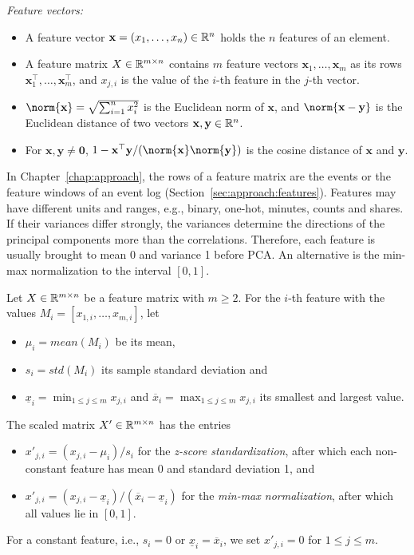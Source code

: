 \medskip
\noindent\emph{Feature vectors:}
\begin{itemize}[beginpenalty=10000]
	\item A feature vector $\mathbf{x} = (x_1, \dots, x_n) \in \mathbb R^n$ holds the $n$ features of an element.
	\item A feature matrix $X \in \mathbb R^{m \times n}$ contains $m$ feature vectors $\mathbf{x}_1, \dots, \mathbf{x}_m$ as its rows $\mathbf{x}_1^\top, \dots, \mathbf{x}_m^\top$, and $x_{j,i}$ is the value of the $i$-th feature in the $j$-th vector.
	\item $\norm{\mathbf{x}} = \sqrt{\sum_{i=1}^{n} x_i^2}$ is the Euclidean norm of $\mathbf{x}$, and $\norm{\mathbf{x} - \mathbf{y}}$ is the Euclidean distance of two vectors $\mathbf{x}, \mathbf{y} \in \mathbb R^n$.
	\item For $\mathbf{x}, \mathbf{y} \neq \mathbf{0}$, $1 - \mathbf{x}^\top \mathbf{y} / (\norm{\mathbf{x}} \norm{\mathbf{y}})$ is the cosine distance of $\mathbf{x}$ and $\mathbf{y}$.
\end{itemize}

In Chapter~\ref{chap:approach}, the rows of a feature matrix are the events or the feature windows of an event log (Section~\ref{sec:approach:features}). Features may have different units and ranges, e.g., binary, one-hot, minutes, counts and shares. If their variances differ strongly, the variances determine the directions of the principal components more than the correlations. Therefore, each feature is usually brought to mean 0 and variance 1 before PCA. An alternative is the min-max normalization to the interval $[0, 1]$.

\begin{definition}[Scaling]
	\label{def:prelim:scaling}
	Let $X \in \mathbb R^{m \times n}$ be a feature matrix with $m \ge 2$. For the $i$-th feature with the values $M_i = [x_{1,i}, \dots, x_{m,i}]$, let
	\begin{itemize}
		\item $\mu_i = \mathit{mean}(M_i)$ be its mean,
		\item $s_i = \mathit{std}(M_i)$ its sample standard deviation and
		\item $\underline{x}_i = \min_{1 \le j \le m} x_{j,i}$ and $\overline{x}_i = \max_{1 \le j \le m} x_{j,i}$ its smallest and largest value.
	\end{itemize}
	The scaled matrix $X' \in \mathbb R^{m \times n}$ has the entries
	\begin{itemize}
		\item $x'_{j,i} = (x_{j,i} - \mu_i) / s_i$ for the \emph{z-score standardization}, after which each non-constant feature has mean 0 and standard deviation 1, and
		\item $x'_{j,i} = (x_{j,i} - \underline{x}_i) / (\overline{x}_i - \underline{x}_i)$ for the \emph{min-max normalization}, after which all values lie in $[0, 1]$.
	\end{itemize}
	For a constant feature, i.e., $s_i = 0$ or $\underline{x}_i = \overline{x}_i$, we set $x'_{j,i} = 0$ for $1 \le j \le m$.
\end{definition}

